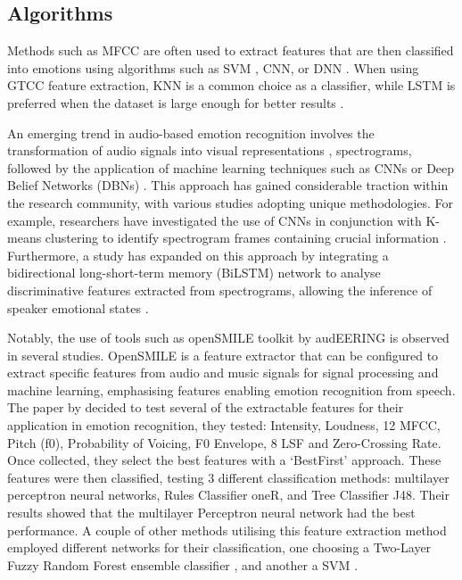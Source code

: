 \subsection{Algorithms}

Methods such as MFCC are often used to extract features that are then classified into emotions using algorithms such as SVM \cite{Khan2023-nz}, CNN, or DNN \cite{Shanta2021-af} \cite{Qayyum2019-bt}. When using GTCC feature extraction, KNN is a common choice as a classifier, while LSTM is preferred when the dataset is large enough for better results \cite{Zhu2019-iq}.

An emerging trend in audio-based emotion recognition involves the transformation of audio signals into visual representations \cite{Augello2022-hm}, spectrograms, followed by the application of machine learning techniques such as CNNs \cite{Jaiswal2020-vi} or Deep Belief Networks (DBNs) \cite{Mohammed2020-ig}. This approach has gained considerable traction within the research community, with various studies adopting unique methodologies. For example, researchers have investigated the use of CNNs in conjunction with K-means clustering to identify spectrogram frames containing crucial information \cite{Hajarolasvadi2019-nz}. Furthermore, a study has expanded on this approach by integrating a bidirectional long-short-term memory (BiLSTM) network to analyse discriminative features extracted from spectrograms, allowing the inference of speaker emotional states \cite{Mustaqeem2020-ax}.

Notably, the use of tools such as openSMILE toolkit by audEERING is observed in several studies. OpenSMILE is a feature extractor that can be configured to extract specific features from audio and music signals for signal processing and machine learning, emphasising features enabling emotion recognition from speech. The paper by \cite{Anjum2019-ks} decided to test several of the extractable features for their application in emotion recognition, they tested: Intensity, Loudness, 12 MFCC, Pitch (f0), Probability of Voicing, F0 Envelope, 8 LSF and Zero-Crossing Rate. Once collected, they select the best features with a `BestFirst' approach.  These features were then classified, testing 3 different classification methods: multilayer perceptron neural networks, Rules Classifier oneR, and Tree Classifier J48. Their results showed that the multilayer Perceptron neural network had the best performance. A couple of other methods utilising this feature extraction method employed different networks for their classification, one choosing a Two-Layer Fuzzy Random Forest ensemble classifier \cite{Chen2020-bt}, and another a SVM \cite{Ashok2022-xp}.

